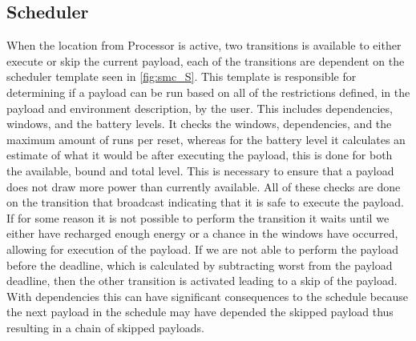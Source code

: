 \subsection{Scheduler}
When the location  from Processor is active, two transitions is available to either execute or skip the current payload, each of the transitions are dependent on the scheduler template seen in \cref{fig:smc_S}. This template is responsible for determining if a payload can be run based on all of the restrictions defined, in the payload and environment description, by the user. This includes dependencies, windows, and the battery levels. It checks the windows, dependencies, and the maximum amount of runs per reset, whereas for the battery level it calculates an estimate of what it would be after executing the payload, this is done for both the available, bound and total level.
This is necessary to ensure that a payload does not draw more power than currently available. All of these checks are done on the transition that broadcast  indicating that it is safe to execute the payload. \\
If for some reason it is not possible to perform the transition it waits until we either have recharged enough energy or a chance in the windows have occurred, allowing for execution of the payload. If we are not able to perform the payload before the deadline, which is calculated by subtracting worst from the payload deadline, then the other transition is activated leading to a skip of the payload. With dependencies this can have significant consequences to the schedule because the next payload in the schedule may have depended the skipped payload thus resulting in a chain of skipped payloads.

